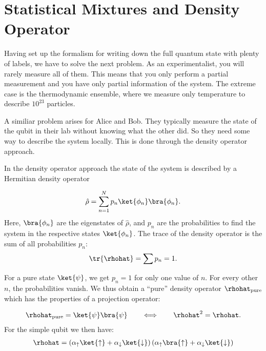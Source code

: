 \section{Statistical Mixtures and Density Operator}

Having set up the formalism for writing down the full quantum state with plenty of labels, we have to solve the next problem. As an experimentalist, you will rarely measure all of them. This means that you only perform a partial measurement and you have only partial information of the system. The extreme case is the thermodynamic ensemble, where we measure only temperature to describe $10^{23}$ particles.

A similiar problem arises for Alice and Bob. They typically measure the state of the qubit in their lab without knowing what the other did. So they need some way to describe the system locally. This is done through the density operator approach.

In the density operator approach the state of the system is described by a Hermitian density operator

\begin{align}
 \hat{\rho} = \sum_{n=1}^N p_n \ket{\phi_n}\bra{\phi_n}.
\end{align}
Here, $\bra{\phi_n}$ are the eigenstates of $\hat{\rho}$, and $p_n$ are the probabilities to find the system in the respective states $\ket{\phi_n}$. The trace of the density operator is the sum of all probabilities $p_n$:
\begin{align}
  \tr{\rhohat} = \sum p_n = 1.
\end{align}

For a pure state $\ket{\psi}$, we get $p_n=1$ for only one value of $n$. For every other $n$, the probabilities vanish. We thus obtain a ``pure'' density operator $\rhohat_{\text{pure}}$ which has the properties of a projection operator:

\begin{align}
	\rhohat_{\text{pure}} = \ket{\psi}\bra{\psi} \qquad \Longleftrightarrow \qquad \rhohat^2 = \rhohat.
\end{align}
For the simple qubit we then have:
\begin{align}
  \rhohat = \left(\alpha_\uparrow\ket{\uparrow}+\alpha_\downarrow\ket{\downarrow}\right)\left(\alpha_\uparrow\bra{\uparrow}+\alpha_\downarrow\ket{\downarrow}\right)
\end{align}

